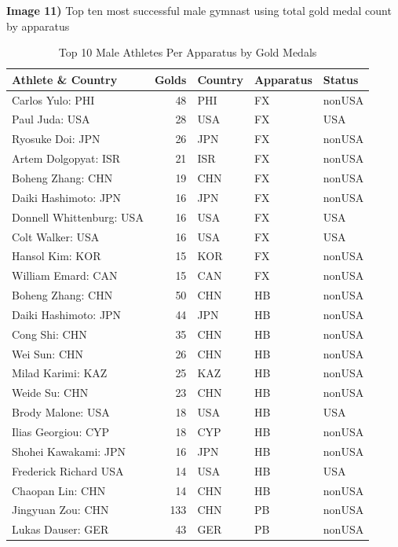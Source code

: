 \documentclass[
  10.5pt,
  letterpaper,
  DIV=11,
  numbers=noendperiod]{scrartcl}
\begin{document}
\textbf{Image 11)} Top ten most successful male gymnast using total gold
medal count by apparatus

\begin{table}[H]

\caption{Top 10 Male Athletes Per Apparatus by Gold Medals}
\centering
\fontsize{8}{10}\selectfont
\begin{tabular}[t]{l|r|l|l|l}
\hline
Athlete \& Country & Golds & Country & Apparatus & Status\\
\hline
Carlos Yulo: PHI & 48 & PHI & FX & nonUSA\\
\hline
Paul Juda: USA & 28 & USA & FX & USA\\
\hline
Ryosuke Doi: JPN & 26 & JPN & FX & nonUSA\\
\hline
Artem Dolgopyat: ISR & 21 & ISR & FX & nonUSA\\
\hline
Boheng Zhang: CHN & 19 & CHN & FX & nonUSA\\
\hline
Daiki Hashimoto: JPN & 16 & JPN & FX & nonUSA\\
\hline
Donnell Whittenburg: USA & 16 & USA & FX & USA\\
\hline
Colt Walker: USA & 16 & USA & FX & USA\\
\hline
Hansol Kim: KOR & 15 & KOR & FX & nonUSA\\
\hline
William Emard: CAN & 15 & CAN & FX & nonUSA\\
\hline
Boheng Zhang: CHN & 50 & CHN & HB & nonUSA\\
\hline
Daiki Hashimoto: JPN & 44 & JPN & HB & nonUSA\\
\hline
Cong Shi: CHN & 35 & CHN & HB & nonUSA\\
\hline
Wei Sun: CHN & 26 & CHN & HB & nonUSA\\
\hline
Milad Karimi: KAZ & 25 & KAZ & HB & nonUSA\\
\hline
Weide Su: CHN & 23 & CHN & HB & nonUSA\\
\hline
Brody Malone: USA & 18 & USA & HB & USA\\
\hline
Ilias Georgiou: CYP & 18 & CYP & HB & nonUSA\\
\hline
Shohei Kawakami: JPN & 16 & JPN & HB & nonUSA\\
\hline
Frederick Richard USA & 14 & USA & HB & USA\\
\hline
Chaopan Lin: CHN & 14 & CHN & HB & nonUSA\\
\hline
Jingyuan Zou: CHN & 133 & CHN & PB & nonUSA\\
\hline
Lukas Dauser: GER & 43 & GER & PB & nonUSA\\

\end{tabular}
\end{table}
\end{document}
